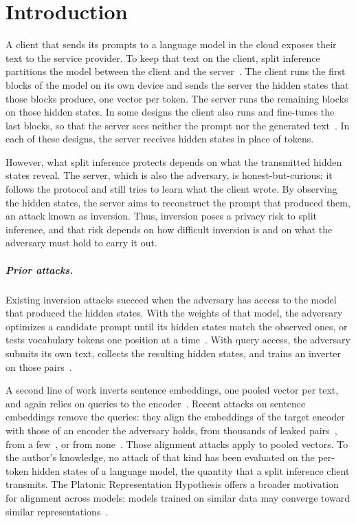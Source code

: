 \providecommand{\vf}[1]{\textcolor{blue}{#1}}
\providecommand{\missb}[1]{{\setlength{\fboxsep}{1.5pt}\colorbox[RGB]{255,221,196}{\textcolor[RGB]{150,50,0}{\textbf{#1}}}}}
\chapter{Introduction}\label{ch:intro}

A client that sends its prompts to a language model in the cloud exposes their text to the service provider.
To keep that text on the client, split inference partitions the model between the client and the server~\cite{he2019model,mai2024split,nguyen2026noir}.
The client runs the first blocks of the model on its own device and sends the server the hidden states that those blocks produce, one vector per token.
The server runs the remaining blocks on those hidden states.
In some designs the client also runs and fine-tunes the last blocks, so that the server sees neither the prompt nor the generated text~\cite{nguyen2026noir}.
In each of these designs, the server receives hidden states in place of tokens.

However, what split inference protects depends on what the transmitted hidden states reveal.
The server, which is also the adversary, is honest-but-curious: it follows the protocol and still tries to learn what the client wrote.
By observing the hidden states, the server aims to reconstruct the prompt that produced them, an attack known as inversion.
Thus, inversion poses a privacy risk to split inference, and that risk depends on how difficult inversion is and on what the adversary must hold to carry it out.

\paragraph{Prior attacks.} Existing inversion attacks succeed when the adversary has access to the model that produced the hidden states.
With the weights of that model, the adversary optimizes a candidate prompt until its hidden states match the observed ones, or tests vocabulary tokens one position at a time~\cite{qu2025prompt,dong2025depth,thomas2025hidden,nikolaou2026language}.
With query access, the adversary submits its own text, collects the resulting hidden states, and trains an inverter on those pairs~\cite{luo2025prompt,dong2025depth}.

A second line of work inverts sentence embeddings, one pooled vector per text, and again relies on queries to the encoder~\cite{song2020information,li2023sentence,morris2023text}.
Recent attacks on sentence embeddings remove the queries: they align the embeddings of the target encoder with those of an encoder the adversary holds, from thousands of leaked pairs~\cite{huang2024transferable}, from a few~\cite{chen2025algen}, or from none~\cite{jha2025harnessing}.
Those alignment attacks apply to pooled vectors.
To the author's knowledge, no attack of that kind has been evaluated on the per-token hidden states of a language model, the quantity that a split inference client transmits.
The Platonic Representation Hypothesis offers a broader motivation for alignment across models: models trained on similar data may converge toward similar representations~\cite{huh2024platonic}.

